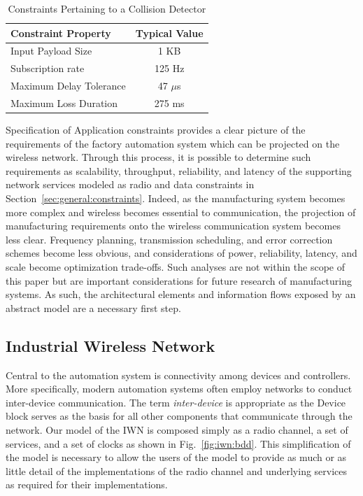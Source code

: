 \documentclass[journal, twoside]{IEEEtran}
\begin{document}
\begin{table}[tbp]
\centering
\caption{Constraints Pertaining to a Collision Detector} \label{tab:sample:constraints}
\begin{tabular}{lc}
 
\textbf{Constraint Property} &
  \textbf{Typical Value}
  \\
\midrule
Input Payload Size &
  1 KB
  \\
Subscription rate &
  125 Hz
  \\
Maximum Delay Tolerance &
  47 $\mu$s
  \\
Maximum Loss Duration &
  275 ms
  \\
\end{tabular}%

\end{table}
	
	Specification of Application constraints provides a clear picture of the requirements of the factory automation system which can be projected on the wireless network. Through this process, it is possible to determine such requirements as scalability, throughput, reliability, and latency of the supporting network services modeled as radio and data constraints in Section~\ref{sec:general:constraints}. Indeed, as the manufacturing system becomes more complex and wireless becomes essential to communication, the projection of manufacturing requirements onto the wireless communication system becomes less clear.  Frequency planning, transmission scheduling, and error correction schemes become less obvious, and considerations of power, reliability, latency, and scale become optimization trade-offs. Such analyses are not within the scope of this paper but are important considerations for future research of manufacturing systems.  As such, the architectural elements and information flows exposed by an abstract model are a necessary first step.
	
	\subsection{Industrial Wireless Network}
	
	Central to the automation system is connectivity among devices and controllers.  More specifically, modern automation systems often employ networks to conduct inter-device communication.  The term \textit{inter-device} is appropriate as the Device block serves as the basis for all other components that communicate through the network.  Our model of the IWN is composed simply as a radio channel, a set of services, and a set of clocks as shown in Fig.~\ref{fig:iwn:bdd}.  This simplification of the model is necessary to allow the users of the model to provide as much or as little detail of the implementations of the radio channel and underlying services as required for their implementations.
	
\end{document}
